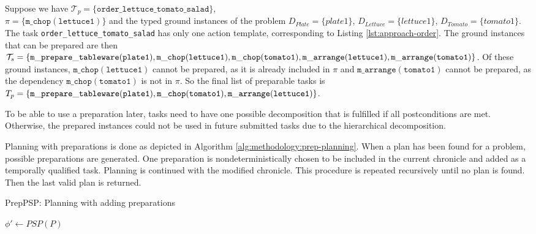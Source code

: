 \begin{example}
  Suppose we have $\mathcal{T}_p = \{\mathtt{order\_lettuce\_tomato\_salad}\}$, \\ $\pi=\{\mathtt{m\_chop(lettuce1)}\}$ and the typed ground instances of the problem $D_{Plate}=\{plate1\}$, $D_{Lettuce}=\{lettuce1\}$, $D_{Tomato}=\{tomato1\}$.
  The task \verb|order_lettuce_tomato_salad| has only one action template, corresponding to Listing \ref{lst:approach-order}.
  The ground instances that can be prepared are then $\mathcal{T}_s=\{\mathtt{m\_prepare\_tableware(plate1)}, \mathtt{m\_chop(lettuce1)},\\ \mathtt{m\_chop(tomato1)}, \mathtt{m\_arrange(lettuce1)}, \mathtt{m\_arrange(tomato1)}\}$.
  Of these ground instances, $\mathtt{m\_chop(lettuce1)}$ cannot be prepared, as it is already included in $\pi$ and $\mathtt{m\_arrange(tomato1)}$ cannot be prepared, as the dependency $\mathtt{m\_chop(tomato1)}$ is not in $\pi$.
  So the final list of preparable tasks is $T_p=\{\mathtt{m\_prepare\_tableware(plate1)}, \mathtt{m\_chop(tomato1)},\\ \mathtt{m\_arrange(lettuce1)}\}$.
\end{example}

To be able to use a preparation later, tasks need to have one possible decomposition that is fulfilled if all postconditions are met.
Otherwise, the prepared instances could not be used in future submitted tasks due to the hierarchical decomposition.


Planning with preparations is done as depicted in Algorithm \ref{alg:methodology:prep-planning}.
When a plan has been found for a problem, possible preparations are generated.
One preparation is nondeterministically chosen to be included in the current chronicle and added as a temporally qualified task.
Planning is continued with the modified chronicle.
This procedure is repeated recursively until no plan is found.
Then the last valid plan is returned.

\begin{algorithm}[t]
    \caption{PrepPSP: Planning with adding preparations}
    \label{alg:methodology:prep-planning}
    $\phi' \leftarrow PSP(P)$\;
\end{algorithm}

